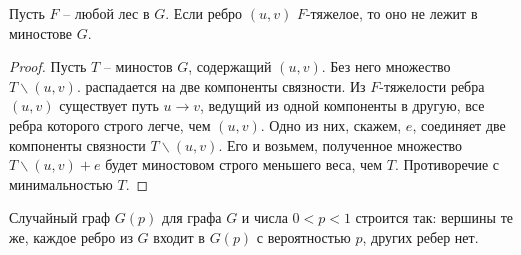 \begin{lemma*} Пусть $F$ -- любой лес в $G$. Если ребро $(u,v)$ $F$-тяжелое, то оно не лежит в миностове $G$.
\end{lemma*}
\begin{proof}
    Пусть $T$ -- миностов $G$, содержащий $(u,v)$. Без него множество $T\smallsetminus(u,v)$. распадается на две компоненты связности. Из $F$-тяжелости ребра $(u,v)$ существует путь $u\rightarrow v$, ведущий из одной компоненты в другую, все ребра которого строго легче, чем $(u,v)$. Одно из них, скажем, $e$, соединяет две компоненты связности $T\smallsetminus(u,v)$. Его и возьмем, полученное множество $T\smallsetminus(u,v) + e$ будет миностовом строго меньшего веса, чем $T$. Противоречие с минимальностью $T$.
\end{proof}

\begin{definition*}
    Случайный граф $G(p)$ для графа $G$ и числа $0 < p < 1$ строится так: вершины те же, каждое ребро из $G$ входит в $G(p)$ с вероятностью $p$, других ребер нет.
\end{definition*}

